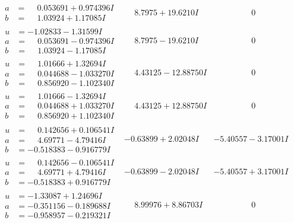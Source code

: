 \documentclass[1p]{elsarticle_modified}
\theoremstyle{definition}
\begin{document}
$$\begin{array}{c|c|c}
\begin{aligned}
a &= \phantom{-}0.053691 + 0.974396 I \\
b &= \phantom{-}1.03924 + 1.17085 I\end{aligned}
 & \phantom{-}8.7975 + 19.6210 I & \phantom{-0.000000 } 0 \\ \hline\begin{aligned}
u &= -1.02833 - 1.31599 I \\
a &= \phantom{-}0.053691 - 0.974396 I \\
b &= \phantom{-}1.03924 - 1.17085 I\end{aligned}
 & \phantom{-}8.7975 - 19.6210 I & \phantom{-0.000000 } 0 \\ \hline\begin{aligned}
u &= \phantom{-}1.01666 + 1.32694 I \\
a &= \phantom{-}0.044688 - 1.033270 I \\
b &= \phantom{-}0.856920 - 1.102340 I\end{aligned}
 & \phantom{-}4.43125 - 12.88750 I & \phantom{-0.000000 } 0 \\ \hline\begin{aligned}
u &= \phantom{-}1.01666 - 1.32694 I \\
a &= \phantom{-}0.044688 + 1.033270 I \\
b &= \phantom{-}0.856920 + 1.102340 I\end{aligned}
 & \phantom{-}4.43125 + 12.88750 I & \phantom{-0.000000 } 0 \\ \hline\begin{aligned}
u &= \phantom{-}0.142656 + 0.106541 I \\
a &= \phantom{-}4.69771 - 4.79416 I \\
b &= -0.518383 - 0.916779 I\end{aligned}
 & -0.63899 + 2.02048 I & -5.40557 - 3.17001 I \\ \hline\begin{aligned}
u &= \phantom{-}0.142656 - 0.106541 I \\
a &= \phantom{-}4.69771 + 4.79416 I \\
b &= -0.518383 + 0.916779 I\end{aligned}
 & -0.63899 - 2.02048 I & -5.40557 + 3.17001 I \\ \hline\begin{aligned}
u &= -1.33087 + 1.24696 I \\
a &= -0.351156 - 0.189688 I \\
b &= -0.958957 - 0.219321 I\end{aligned}
 & \phantom{-}8.99976 + 8.86703 I & \phantom{-0.000000 } 0 \\ \hline\begin{aligned}

\end{aligned}
\end{array}$$
\end{document}
